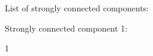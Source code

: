 \documentclass{article}
\begin{document}
List of strongly connected components:

Strongly connected component 1:

1
\end{document}
